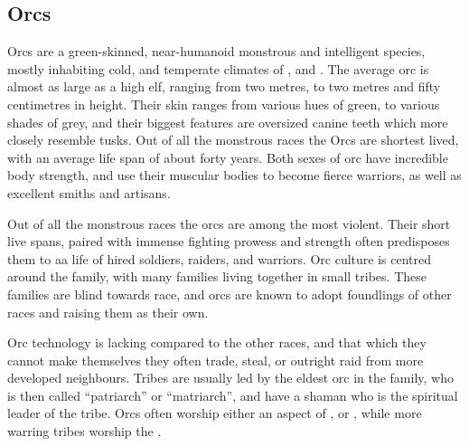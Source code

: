 \subsection{Orcs}
\label{sec:Orcs}

Orcs are a green-skinned, near-humanoid monstrous and intelligent species,
mostly inhabiting cold, and temperate climates of ,
 and . The average orc is almost
as large as a high elf, ranging from two metres, to two metres and fifty
centimetres in height. Their skin ranges from various hues of green, to
various shades of grey, and their biggest features are oversized canine teeth
which more closely resemble tusks. Out of all the monstrous races the Orcs are
shortest lived, with an average life span of about forty years. Both sexes of
orc have incredible body strength, and use their muscular bodies to become
fierce warriors, as well as excellent smiths and artisans.

Out of all the monstrous races the orcs are among the most violent. Their short
live spans, paired with immense fighting prowess and strength often predisposes
them to aa life of hired soldiers, raiders, and warriors. Orc culture is
centred around the family, with many families living together in small tribes.
These families are blind towards race, and orcs are known to adopt foundlings
of other races and raising them as their own.

Orc technology is lacking compared to the other races, and that which they
cannot make themselves they often trade, steal, or outright raid from more
developed neighbours. Tribes are usually led by the eldest orc in the family,
who is then called ``patriarch'' or ``matriarch'', and have a shaman who is
the spiritual leader of the tribe. Orcs often worship either an aspect of
, or , while more warring tribes
worship the .
